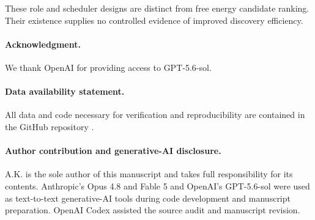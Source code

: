 \documentclass[11pt]{article}
\theoremstyle{definition}
\theoremstyle{remark}
\begin{document}
These role and scheduler designs are distinct from free energy candidate ranking.
Their existence supplies no controlled evidence of improved discovery efficiency.

\paragraph{Acknowledgment.}
We thank OpenAI for providing access to GPT-5.6-sol.

\paragraph{Data availability statement.}
All data and code necessary for verification and reproducibility are contained in the GitHub repository \cite{gkmrepo}.

\paragraph{Author contribution and generative-AI disclosure.}
A.K. is the sole author of this manuscript and takes full responsibility for its
contents. Anthropic's Opus 4.8 and Fable 5 and OpenAI's GPT-5.6-sol were used as
text-to-text generative-AI tools during code development and manuscript preparation.
OpenAI Codex assisted the source audit and manuscript revision.

{\small


}
\end{document}
